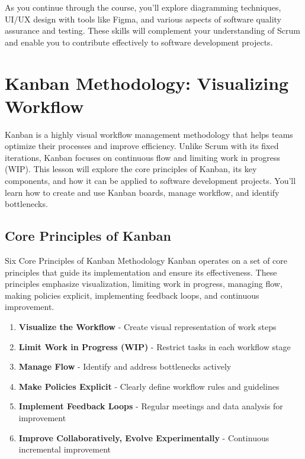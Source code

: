 As you continue through the course, you'll explore diagramming techniques,
UI/UX design with tools like Figma, and various aspects of software quality
assurance and testing. These skills will complement your understanding of Scrum
and enable you to contribute effectively to software development projects.

\section{Kanban Methodology: Visualizing Workflow}

Kanban is a highly visual workflow management methodology that helps teams
optimize their processes and improve efficiency. Unlike Scrum with its fixed
iterations, Kanban focuses on continuous flow and limiting work in progress
(WIP). This lesson will explore the core principles of Kanban, its key
components, and how it can be applied to software development projects. You'll
learn how to create and use Kanban boards, manage workflow, and identify
bottlenecks.


\subsection{Core Principles of Kanban}

\begin{conceptcard}{Six Core Principles of Kanban Methodology}
  Kanban operates on a set of core principles that guide its implementation and ensure its effectiveness. These principles emphasize visualization, limiting work in progress, managing flow, making policies explicit, implementing feedback loops, and continuous improvement.

  \begin{enumerate}
    \item \textbf{Visualize the Workflow} - Create visual representation of work steps
    \item \textbf{Limit Work in Progress (WIP)} - Restrict tasks in each workflow stage
    \item \textbf{Manage Flow} - Identify and address bottlenecks actively
    \item \textbf{Make Policies Explicit} - Clearly define workflow rules and guidelines
    \item \textbf{Implement Feedback Loops} - Regular meetings and data analysis for improvement
    \item \textbf{Improve Collaboratively, Evolve Experimentally} - Continuous incremental improvement
  \end{enumerate}
\end{conceptcard}

